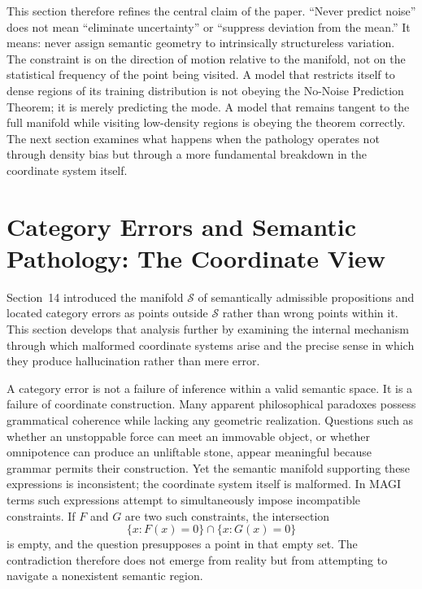 \documentclass[11pt,a4paper,twocolumn]{article}
\begin{document}
This section therefore refines the central claim of the paper.
``Never predict noise'' does not mean ``eliminate uncertainty''
or ``suppress deviation from the mean.'' It means: never assign
semantic geometry to intrinsically structureless variation. The
constraint is on the direction of motion relative to the manifold,
not on the statistical frequency of the point being visited.
A model that restricts itself to dense regions of its training
distribution is not obeying the No-Noise Prediction Theorem; it
is merely predicting the mode. A model that remains tangent to
the full manifold while visiting low-density regions is obeying
the theorem correctly. The next section examines what happens
when the pathology operates not through density bias but through
a more fundamental breakdown in the coordinate system itself.


\section{Category Errors and Semantic Pathology: The Coordinate View}

Section~14 introduced the manifold $\mathcal{S}$ of semantically
admissible propositions and located category errors as points
outside $\mathcal{S}$ rather than wrong points within it. This
section develops that analysis further by examining the internal
mechanism through which malformed coordinate systems arise and
the precise sense in which they produce hallucination rather
than mere error.

A category error is not a failure of inference within a valid
semantic space. It is a failure of coordinate construction. Many
apparent philosophical paradoxes possess grammatical coherence
while lacking any geometric realization. Questions such as
whether an unstoppable force can meet an immovable object, or
whether omnipotence can produce an unliftable stone, appear
meaningful because grammar permits their construction. Yet the
semantic manifold supporting these expressions is inconsistent;
the coordinate system itself is malformed. In MAGI terms such
expressions attempt to simultaneously impose incompatible
constraints. If $F$ and $G$ are two such constraints, the
intersection
\[
\{x : F(x)=0\} \cap \{x : G(x)=0\}
\]
is empty, and the question presupposes a point in that empty
set. The contradiction therefore does not emerge from reality
but from attempting to navigate a nonexistent semantic region.
\end{document}
